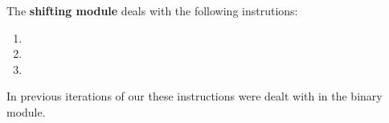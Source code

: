 The \textbf{shifting module} deals with the following instrutions:
\begin{multicols}{3}
\begin{enumerate}
	\item {}
	\item {}
	\item {}
\end{enumerate}
\end{multicols}
\noindent In previous iterations of our \zkEvm{} these instructions were dealt with in the binary module.